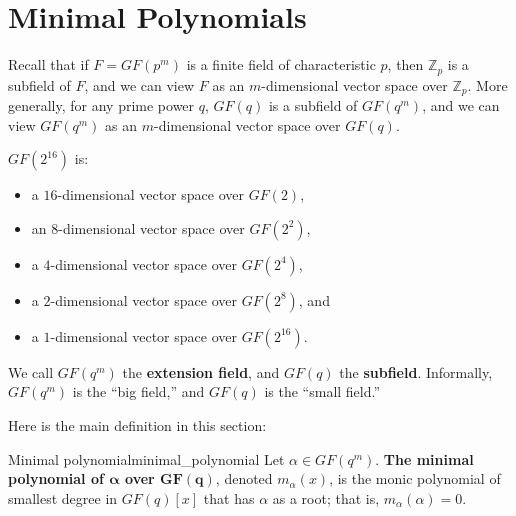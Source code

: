 \section{Minimal Polynomials}
Recall that if $ F=GF(p^m) $ is a finite field of characteristic $ p $,
then $ \mathbb{Z}_p $ is a subfield of $ F $, and we can view
$ F $ as an $ m $-dimensional vector space over $ \mathbb{Z}_p $. More
generally, for any prime power $ q $, $ GF(q) $ is a subfield of $ GF(q^m) $,
and we can view $ GF(q^m) $ as an $ m $-dimensional vector space over $ GF(q) $.

\begin{Example}{}{}
    $ GF(2^{16}) $ is:
    \begin{itemize}
        \item a $ 16 $-dimensional vector space over $ GF(2) $,
        \item an $ 8 $-dimensional vector space over $ GF(2^2) $,
        \item a $ 4 $-dimensional vector space over $ GF(2^4) $,
        \item a $ 2 $-dimensional vector space over $ GF(2^8) $, and
        \item a $ 1 $-dimensional vector space over $ GF(2^{16}) $.
    \end{itemize}
\end{Example}

We call $ GF(q^m) $ the \textbf{extension field}, and $ GF(q) $ the \textbf{subfield}.
Informally, $ GF(q^m) $ is the ``big field,'' and $ GF(q) $ is the ``small field.''

Here is the main definition in this section:

\begin{Definition}{Minimal polynomial}{minimal_polynomial}
    Let $ \alpha\in GF(q^m) $. \textbf{The minimal polynomial
        of $ \symbf{\alpha} $ over $ \symbf{GF(q)} $}, denoted $ m_\alpha(x) $, is
    the monic polynomial of smallest degree in $ GF(q)[x] $ that
    has $ \alpha $ as a root; that is, $ m_\alpha(\alpha)=0 $.
\end{Definition}

